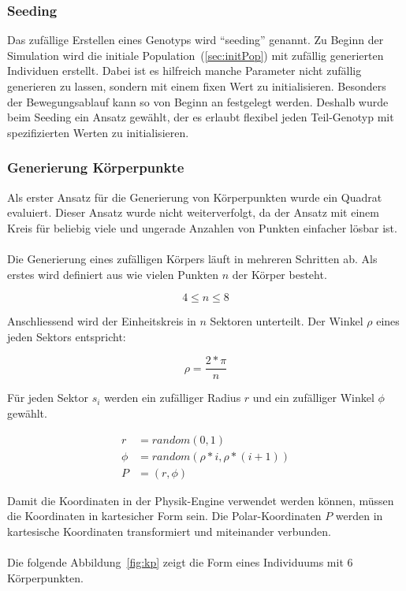       \subsubsection{Seeding\label{subsub:GenotypeSeeding}}

        Das zufällige Erstellen eines Genotyps wird ``seeding'' genannt.
        Zu Beginn der Simulation wird die initiale Population~(\vref{sec:initPop}) mit zufällig generierten Individuen erstellt.
        Dabei ist es hilfreich manche Parameter nicht zufällig generieren zu lassen,
        sondern mit einem fixen Wert zu initialisieren.
        Besonders der Bewegungsablauf kann so von Beginn an festgelegt werden.
        Deshalb wurde beim Seeding ein Ansatz gewählt, der es erlaubt flexibel jeden Teil-Genotyp mit
        spezifizierten Werten zu initialisieren.

      \subsubsection{Generierung Körperpunkte\label{subsub:GenotypeBodypointCreation}}

        Als erster Ansatz für die Generierung von Körperpunkten wurde ein Quadrat evaluiert.
        Dieser Ansatz wurde nicht weiterverfolgt,
        da der Ansatz mit einem Kreis für beliebig viele und ungerade Anzahlen von Punkten einfacher lösbar ist.
        \\
        \\
        Die Generierung eines zufälligen Körpers läuft in mehreren Schritten ab.
        Als erstes wird definiert aus wie vielen Punkten \( n \) der Körper besteht.

        \[ 4 \leq n \leq 8 \]

        Anschliessend wird der Einheitskreis in \( n \) Sektoren unterteilt.
        Der Winkel \( \rho \) eines jeden Sektors entspricht:

        \[ \rho = \frac{2 * \pi}{n} \]

        Für jeden Sektor \( s_{i} \) werden ein zufälliger Radius \( r \) und ein zufälliger Winkel \( \phi \) gewählt.

        \begin{align*}
          r &= random(0, 1) \\
          \phi &= random(\rho * i, \rho * (i + 1)) \\
          P &= (r, \phi)
        \end{align*}

        Damit die Koordinaten in der Physik-Engine verwendet werden können,
        müssen die Koordinaten in kartesicher Form sein.
        Die Polar-Koordinaten \( P \) werden in kartesische Koordinaten transformiert und miteinander verbunden.
        \\
        \\
        Die folgende Abbildung~\ref{fig:kp} zeigt die Form eines Individuums mit 6 Körperpunkten.

